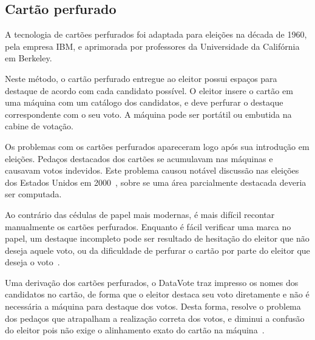 \subsection{Cartão perfurado}

A tecnologia de cartões perfurados foi adaptada para eleições na década de
1960, pela empresa IBM, e aprimorada por professores da Universidade da
Califórnia em Berkeley.

Neste método, o cartão perfurado entregue ao eleitor possui espaços para
destaque de acordo com cada candidato possível. O eleitor insere o cartão em
uma máquina com um catálogo dos candidatos, e deve perfurar o destaque
correspondente com o seu voto. A máquina pode ser portátil ou embutida na
cabine de votação.

Os problemas com os cartões perfurados apareceram logo após sua introdução em
eleições. Pedaços destacados dos cartões se acumulavam nas máquinas e causavam
votos indevidos. Este problema causou notável discussão nas eleições dos
Estados Unidos em 2000~\cite{leib2002florida}, sobre se uma área parcialmente
destacada deveria ser computada.

Ao contrário das cédulas de papel mais modernas, é mais difícil recontar
manualmente os cartões perfurados. Enquanto é fácil verificar uma marca no
papel, um destaque incompleto pode ser resultado de hesitação do eleitor que
não deseja aquele voto, ou da dificuldade de perfurar o cartão por parte do
eleitor que deseja o voto~\cite{roth1998disenfranchised}.

Uma derivação dos cartões perfurados, o DataVote traz impresso os nomes dos
candidatos no cartão, de forma que o eleitor destaca seu voto diretamente e não
é necessária a máquina para destaque dos votos. Desta forma, resolve o problema
dos pedaços que atrapalham a realização correta dos votos, e diminui a confusão
do eleitor pois não exige o alinhamento exato do cartão na
máquina~\cite{cranor2003search}.
